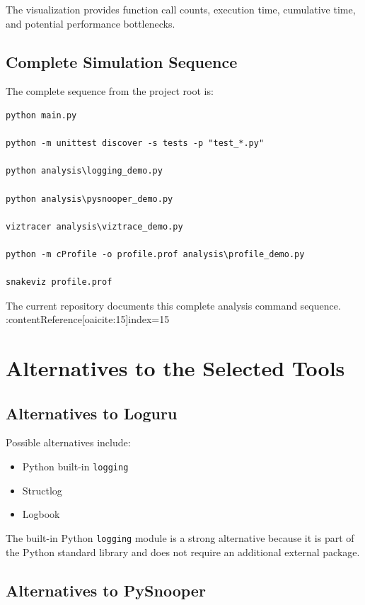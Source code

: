 \documentclass[12pt,a4paper]{report}
\begin{document}
The visualization provides function call counts, execution time,
cumulative time, and potential performance bottlenecks.

\section{Complete Simulation Sequence}

The complete sequence from the project root is:

\begin{lstlisting}
python main.py

python -m unittest discover -s tests -p "test_*.py"

python analysis\logging_demo.py

python analysis\pysnooper_demo.py

viztracer analysis\viztrace_demo.py

python -m cProfile -o profile.prof analysis\profile_demo.py

snakeviz profile.prof
\end{lstlisting}

The current repository documents this complete analysis command
sequence. :contentReference[oaicite:15]{index=15}


\chapter{Alternatives to the Selected Tools}

\section{Alternatives to Loguru}

Possible alternatives include:

\begin{itemize}
    \item Python built-in \texttt{logging}
    \item Structlog
    \item Logbook
\end{itemize}

The built-in Python \texttt{logging} module is a strong alternative
because it is part of the Python standard library and does not require
an additional external package.

\section{Alternatives to PySnooper}
\end{document}
